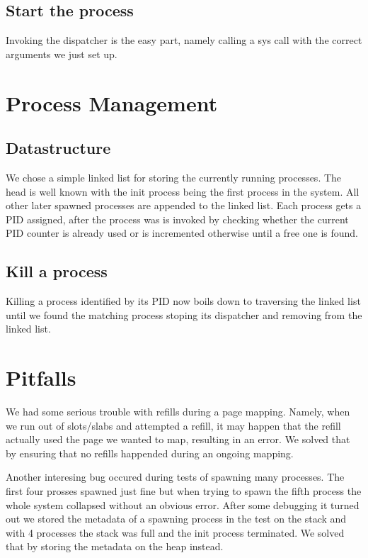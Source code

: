 \subsection{Start the process} 

Invoking the dispatcher is the easy part, namely
calling a sys call with the correct arguments we just set up.

\section{Process Management}

\subsection{Datastructure} 

We chose a simple linked list for storing the
currently running processes. The head is well known with the init process being
the first process in the system.  All other later spawned processes are appended
to the linked list.  Each process gets a PID assigned, after the process was is
invoked by checking whether the current PID counter is already used or is
incremented otherwise until a free one is found.

\subsection{Kill a process} 

Killing a process identified by its PID now boils
down to traversing the linked list until we found the matching process stoping
its dispatcher and removing from the linked list.


\section{Pitfalls} 

We had some serious trouble with refills during a page
mapping. Namely, when we run out of slots/slabs and attempted a refill, it may
happen that the refill actually used the page we wanted to map, resulting in an
error. We solved that by ensuring that no refills happended during an ongoing
mapping.

Another interesing bug occured during tests of spawning many processes. The
first four prosses spawned just fine but when trying to spawn the fifth process
the whole system collapsed without an obvious error. After some debugging it
turned out we stored the metadata of a spawning process in the test on the stack
and with 4 processes the stack was full and the init process terminated. We
solved that by storing the metadata on the heap instead.


